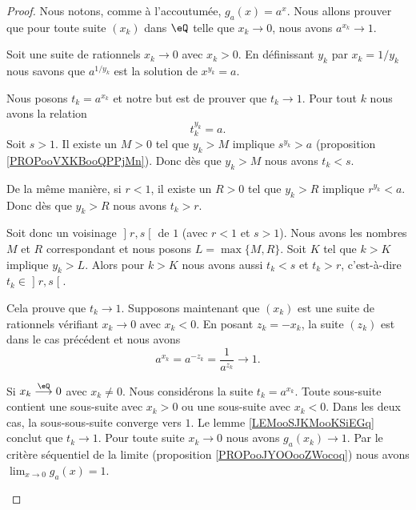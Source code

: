 \begin{proof}
	Nous notons, comme à l'accoutumée, \( g_a(x)=a^x\). Nous allons prouver que pour toute suite \( (x_k)\) dans \( \eQ\) telle que \( x_k\to 0\), nous avons \( a^{x_k}\to 1\).
	\begin{subproof}
		Soit une suite de rationnels \( x_k\to 0\) avec \( x_k>0\). En définissant \( y_k\) par \( x_k=1/y_k\) nous savons que \( a^{1/y_k}\) est la solution de \( x^{y_k}=a\).

		Nous posons \( t_k=a^{x_k}\) et notre but est de prouver que \( t_k\to 1\). Pour tout \( k\) nous avons la relation
		\begin{equation}
			t_k^{y_k}=a.
		\end{equation}
		Soit \( s>1\). Il existe un \( M>0\) tel que \( y_k>M\) implique \( s^{y_k}>a\) (proposition \ref{PROPooVXKBooQPPjMn}). Donc dès que \( y_k>M\) nous avons \( t_k<s\).

		De la même manière, si \( r<1\), il existe un \( R>0\) tel que \( y_k>R\) implique \( r^{y_k}<a\). Donc dès que \( y_k>R\) nous avons \( t_k>r\).

		Soit donc un voisinage \( \mathopen] r , s \mathclose[\) de \( 1\) (avec \( r<1\) et \( s>1\)). Nous avons les nombres \( M\) et \( R\) correspondant et nous posons \( L=\max\{ M,R \}\). Soit \( K\) tel que \( k>K\) implique \( y_k>L\). Alors pour \( k>K\) nous avons aussi \( t_k<s\) et \( t_k>r\), c'est-à-dire \( t_k\in \mathopen] r , s \mathclose[\).

		Cela prouve que \( t_k\to 1\).
		Supposons maintenant que \( (x_k)\) est une suite de rationnels vérifiant \( x_k\to 0\) avec \( x_k<0\). En posant \( z_k=-x_k\), la suite \( (z_k)\) est dans le cas précédent et nous avons
		\begin{equation}
			a^{x_k}=a^{-z_k}=\frac{1}{ a^{z_k} }\to 1.
		\end{equation}

		Si \( x_k\stackrel{\eQ}{\longrightarrow}0\) avec \( x_k\neq 0\). Nous considérons la suite \( t_k=a^{x_k}\). Toute sous-suite contient une sous-suite avec \( x_k>0\) ou une sous-suite avec \( x_k<0\). Dans les deux cas, la sous-sous-suite converge vers \( 1\). Le lemme \ref{LEMooSJKMooKSiEGq} conclut que \( t_k\to 1\).
		\spitem[Conclusion]
		Pour toute suite \( x_k\to 0\) nous avons \( g_a(x_k)\to 1\). Par le critère séquentiel de la limite (proposition \ref{PROPooJYOOooZWocoq}) nous avons \( \lim_{x\to 0} g_a(x)=1\).
	\end{subproof}

\end{proof}


